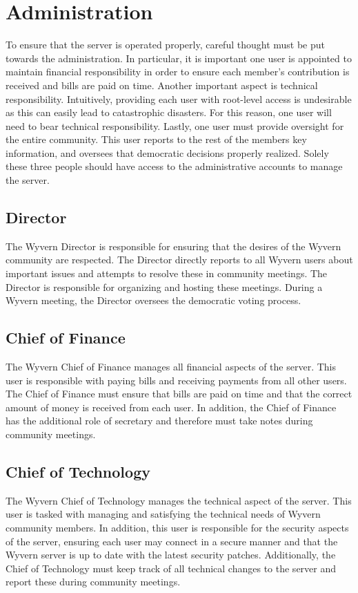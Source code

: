 \section{Administration}
\label{sec:administration}
To ensure that the server is operated properly, careful thought must be put towards the administration. In particular, it is important one user is appointed to maintain financial responsibility in order to ensure each member's contribution is received and bills are paid on time. Another important aspect is technical responsibility. Intuitively, providing each user with root-level access is undesirable as this can easily lead to catastrophic disasters. For this reason, one user will need to bear technical responsibility. Lastly, one user must provide oversight for the entire community. This user reports to the rest of the members key information, and oversees that democratic decisions properly realized. Solely these three people should have access to the administrative accounts to manage the server.

\subsection{Director}
The Wyvern Director is responsible for ensuring that the desires of the Wyvern community are respected. The Director directly reports to all Wyvern users about important issues and attempts to resolve these in community meetings. The Director is responsible for organizing and hosting these meetings. During a Wyvern meeting, the Director oversees the democratic voting process.

\subsection{Chief of Finance}
The Wyvern Chief of Finance manages all financial aspects of the server. This user is responsible with paying bills and receiving payments from all other users. The Chief of Finance must ensure that bills are paid on time and that the correct amount of money is received from each user. In addition, the Chief of Finance has the additional role of secretary and therefore must take notes during community meetings.

\subsection{Chief of Technology}
The Wyvern Chief of Technology manages the technical aspect of the server. This user is tasked with managing and satisfying the technical needs of Wyvern community members. In addition, this user is responsible for the security aspects of the server, ensuring each user may connect in a secure manner and that the Wyvern server is up to date with the latest security patches. Additionally, the Chief of Technology must keep track of all technical changes to the server and report these during community meetings.

